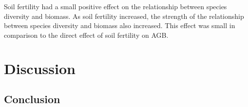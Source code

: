 \documentclass[11pt,a4paper]{article}
\begin{document}
Soil fertility had a small positive effect on the relationship between species diversity and biomass. As soil fertility increased, the strength of the relationship between species diversity and biomass also increased. This effect was small in comparison to the direct effect of soil fertility on AGB.

\section{Discussion}



\subsection{Conclusion}
\end{document}
